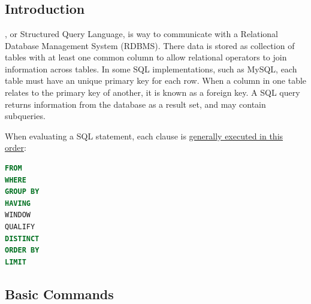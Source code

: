 \chapter{\sql}
\label{sql}

\section{Introduction}
\label{sql:intro}

\sql, or Structured Query Language, is way to
communicate with a Relational Database Management System (RDBMS).
There data is stored as collection of tables with
at least one common column to allow relational operators
to join information across tables.
In some SQL implementations, such as MySQL, each table must have an unique primary key for each row.
When a column in one table relates to the primary key of another, it is known as a foreign key.
A SQL query returns information from the database as a result set, and may contain subqueries.

When evaluating a SQL statement, each clause is
\href{https://cloud.google.com/bigquery/docs/reference/standard-sql/query-syntax#where_clause}{generally executed in this order}:
\begin{lstlisting}[language=SQL]
FROM
WHERE
GROUP BY
HAVING
WINDOW
QUALIFY
DISTINCT
ORDER BY
LIMIT
\end{lstlisting}

\section{Basic Commands}
\label{sql:basic}

